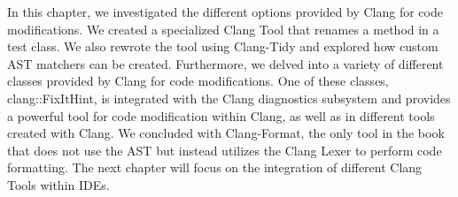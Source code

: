 In this chapter, we investigated the different options provided by Clang for code modifications. We created a specialized Clang Tool that renames a method in a test class. We also rewrote the tool using Clang-Tidy and explored how custom AST matchers can be created. Furthermore, we delved into a variety of different classes provided by Clang for code modifications. One of these classes, clang::FixItHint, is integrated with the Clang diagnostics subsystem and provides a powerful tool for code modification within Clang, as well as in different tools created with Clang. We concluded with Clang-Format, the only tool in the book that does not use the AST but instead utilizes the Clang Lexer to perform code formatting. The next chapter will focus on the integration of different Clang Tools within IDEs.